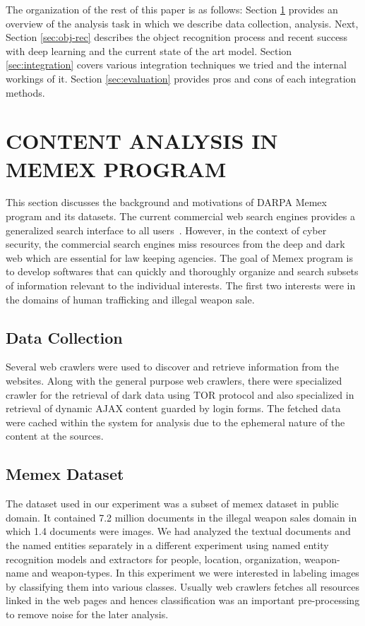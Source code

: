 \documentclass[letterpaper, 10 pt, conference]{ieeeconf}  %
\begin{document}
The organization of the rest of this paper is as follows: Section \ref{sec:memex} provides an overview of the analysis task in which we describe data collection, analysis. Next, Section \ref{sec:obj-rec} describes the object recognition process and recent success with deep learning and the current state of the art model. Section \ref{sec:integration} covers various integration techniques we tried and the internal workings of it. Section \ref{sec:evaluation} provides pros and cons of each integration methods.

\section{CONTENT ANALYSIS IN MEMEX PROGRAM} \label{sec:memex}
This section discusses the background and motivations of DARPA Memex program and its datasets. The current commercial web search engines provides a generalized search interface to all users~\cite{}. However, in the context of cyber security, the commercial search engines miss resources from the deep and dark web which are essential for law keeping agencies. The goal of Memex program is to develop softwares that can quickly and thoroughly organize and search subsets of information relevant to the individual interests. The first two interests were in the domains of human trafficking and illegal weapon sale.
\subsection{Data Collection}
\label{sec:memex-datacollection}
Several web crawlers were used to discover and retrieve information from the websites. 
Along with the general purpose web crawlers, there were specialized crawler for the retrieval of dark data using TOR protocol \cite{} and also specialized in retrieval of dynamic AJAX content guarded by login forms. The fetched data were cached within the system for analysis due to the ephemeral nature of the content at the sources. 

\subsection{Memex Dataset} \label{sec:memex-dataset}
The dataset used in our experiment was a subset of memex dataset in public domain. It contained 7.2 million documents in the illegal weapon sales domain in which 1.4 documents were images. We had analyzed the textual documents and the named entities separately in a different experiment using named entity recognition models and extractors for people, location, organization, weapon-name and weapon-types. In this experiment we were interested in labeling images by classifying them into various classes. Usually web crawlers fetches all resources linked in the web pages and hences classification was an important pre-processing to remove noise for the later analysis.
\end{document}
